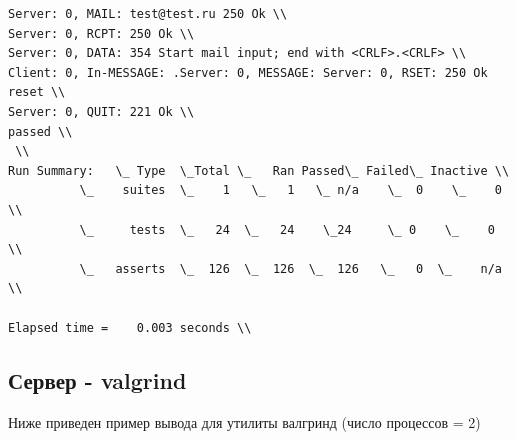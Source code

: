 \documentclass[a4paper,12pt]{report}
\begin{document}
\begin{verbatim}
Server: 0, MAIL: test@test.ru 250 Ok \\
Server: 0, RCPT: 250 Ok \\
Server: 0, DATA: 354 Start mail input; end with <CRLF>.<CRLF> \\
Client: 0, In-MESSAGE: .Server: 0, MESSAGE: Server: 0, RSET: 250 Ok reset \\
Server: 0, QUIT: 221 Ok \\
passed \\
 \\
Run Summary:   \_ Type  \_Total \_   Ran Passed\_ Failed\_ Inactive \\
          \_    suites  \_    1   \_   1   \_ n/a    \_  0    \_    0 \\
          \_     tests  \_   24  \_   24    \_24     \_ 0    \_    0 \\
          \_   asserts  \_  126  \_  126  \_  126   \_   0  \_    n/a \\

Elapsed time =    0.003 seconds \\

\end{verbatim}
\subsection{Сервер - valgrind}
Ниже приведен пример вывода для утилиты валгринд (число процессов = 2) \\
\end{document}
